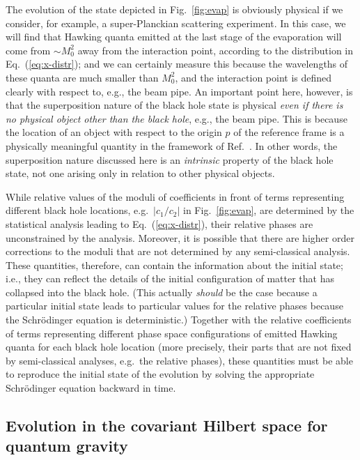 \documentclass[12pt]{article}
\begin{document}
The evolution of the state depicted in Fig.~\ref{fig:evap} is obviously 
physical if we consider, for example, a super-Planckian scattering 
experiment.  In this case, we will find that Hawking quanta emitted 
at the last stage of the evaporation will come from $\sim M_0^2$ 
away from the interaction point, according to the distribution in 
Eq.~(\ref{eq:x-distr}); and we can certainly measure this because the 
wavelengths of these quanta are much smaller than $M_0^2$, and the 
interaction point is defined clearly with respect to, e.g., the beam 
pipe.  An important point here, however, is that the superposition 
nature of the black hole state is physical {\it even if there is no 
physical object other than the black hole}, e.g., the beam pipe.  This 
is because the location of an object with respect to the origin $p$ of 
the reference frame is a physically meaningful quantity in the framework 
of Ref.~\cite{Nomura:2011rb}.  In other words, the superposition nature 
discussed here is an {\it intrinsic} property of the black hole state, 
not one arising only in relation to other physical objects.

While relative values of the moduli of coefficients in front of terms 
representing different black hole locations, e.g.\ $|c_1/c_2|$ in 
Fig.~\ref{fig:evap}, are determined by the statistical analysis leading 
to Eq.~(\ref{eq:x-distr}), their relative phases are unconstrained by 
the analysis.  Moreover, it is possible that there are higher order 
corrections to the moduli that are not determined by any semi-classical 
analysis.  These quantities, therefore, can contain the information about 
the initial state; i.e., they can reflect the details of the initial 
configuration of matter that has collapsed into the black hole.  (This 
actually {\it should} be the case because a particular initial state leads 
to particular values for the relative phases because the Schr\"{o}dinger 
equation is deterministic.)  Together with the relative coefficients 
of terms representing different phase space configurations of emitted 
Hawking quanta for each black hole location (more precisely, their parts 
that are not fixed by semi-classical analyses, e.g.\ the relative phases), 
these quantities must be able to reproduce the initial state of the 
evolution by solving the appropriate Schr\"{o}dinger equation backward 
in time.


\subsection{Evolution in the covariant Hilbert space for quantum gravity}
\label{subsec:evol-H_QG}
\end{document}
